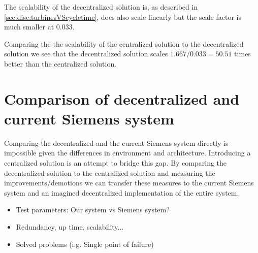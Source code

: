 The scalability of the decentralized solution is, as described in \cref{sec:disc:turbinesVScycletime}, does also scale linearly but the scale factor is much smaller at $0.033$.

Comparing the the scalability of the centralized solution to the decentralized solution we see that the decentralized solution scales $1.667 / 0.033 = 50.51$ times better than the centralized solution.

\section{Comparison of decentralized and current Siemens system}
Comparing the decentralized and the current Siemens system directly is impossible given the differences in environment and architecture. Introducing a centralized solution is an attempt to bridge this gap. By comparing the decentralized solution to the centralized solution and measuring the improvements/demotions we can transfer these measures to the current Siemens system and an imagined decentralized implementation of the entire system. 

\begin{itemize}
	\item Test parameters: Our system vs Siemens system?
	\item Redundancy, up time, scalability...
	\item Solved problems (i.g. Single point of failure)
\end{itemize}